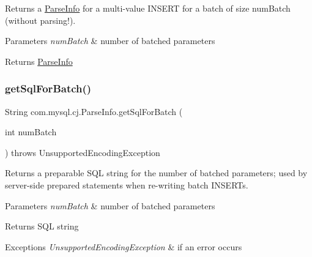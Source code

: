 Returns a \mbox{\hyperlink{classcom_1_1mysql_1_1cj_1_1_parse_info}{Parse\+Info}} for a multi-\/value I\+N\+S\+E\+RT for a batch of size num\+Batch (without parsing!).


\begin{DoxyParams}{Parameters}
{\em num\+Batch} & number of batched parameters \\
\hline
\end{DoxyParams}
\begin{DoxyReturn}{Returns}
\mbox{\hyperlink{classcom_1_1mysql_1_1cj_1_1_parse_info}{Parse\+Info}} 
\end{DoxyReturn}
\mbox{\label{classcom_1_1mysql_1_1cj_1_1_parse_info_a7a1053a89e14ce278d2617ee0f56010f}} 
\subsubsection{\texorpdfstring{get\+Sql\+For\+Batch()}{getSqlForBatch()}\hspace{0.1cm}{\footnotesize\ttfamily [1/2]}}
{\footnotesize\ttfamily String com.\+mysql.\+cj.\+Parse\+Info.\+get\+Sql\+For\+Batch (\begin{DoxyParamCaption}\item[{int}]{num\+Batch }\end{DoxyParamCaption}) throws Unsupported\+Encoding\+Exception}

Returns a preparable S\+QL string for the number of batched parameters; used by server-\/side prepared statements when re-\/writing batch I\+N\+S\+E\+R\+Ts.


\begin{DoxyParams}{Parameters}
{\em num\+Batch} & number of batched parameters \\
\hline
\end{DoxyParams}
\begin{DoxyReturn}{Returns}
S\+QL string 
\end{DoxyReturn}

\begin{DoxyExceptions}{Exceptions}
{\em Unsupported\+Encoding\+Exception} & if an error occurs \\
\hline
\end{DoxyExceptions}
\mbox{\label{classcom_1_1mysql_1_1cj_1_1_parse_info_a49a364ef5d8d3f1ac2ea98576601a926}} 
